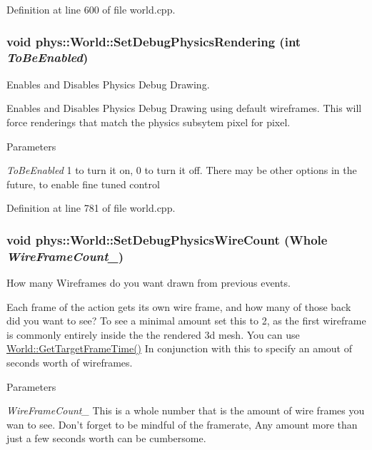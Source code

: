 Definition at line 600 of file world.cpp.

\hypertarget{classphys_1_1World_a9fbd112d2677aa948301287d541b64bb}{
\subsubsection[{SetDebugPhysicsRendering}]{\setlength{\rightskip}{0pt plus 5cm}void phys::World::SetDebugPhysicsRendering (int {\em ToBeEnabled})}}
\label{da/ddf/classphys_1_1World_a9fbd112d2677aa948301287d541b64bb}


Enables and Disables Physics Debug Drawing. 

Enables and Disables Physics Debug Drawing using default wireframes. This will force renderings that match the physics subsytem pixel for pixel. 
\begin{DoxyParams}{Parameters}
\item[{\em ToBeEnabled}]1 to turn it on, 0 to turn it off. There may be other options in the future, to enable fine tuned control \end{DoxyParams}


Definition at line 781 of file world.cpp.

\hypertarget{classphys_1_1World_a6fa4d1e58a78ba0403af1c003fd321d9}{
\subsubsection[{SetDebugPhysicsWireCount}]{\setlength{\rightskip}{0pt plus 5cm}void phys::World::SetDebugPhysicsWireCount ({\bf Whole} {\em WireFrameCount\_\-})}}
\label{da/ddf/classphys_1_1World_a6fa4d1e58a78ba0403af1c003fd321d9}


How many Wireframes do you want drawn from previous events. 

Each frame of the action gets its own wire frame, and how many of those back did you want to see? To see a minimal amount set this to 2, as the first wireframe is commonly entirely inside the the rendered 3d mesh. You can use \hyperlink{classphys_1_1World_aa063ace52be484c7b03ec5859453f48b}{World::GetTargetFrameTime()} In conjunction with this to specify an amout of seconds worth of wireframes. 
\begin{DoxyParams}{Parameters}
\item[{\em WireFrameCount\_\-}]This is a whole number that is the amount of wire frames you wan to see. Don't forget to be mindful of the framerate, Any amount more than just a few seconds worth can be cumbersome. \end{DoxyParams}


